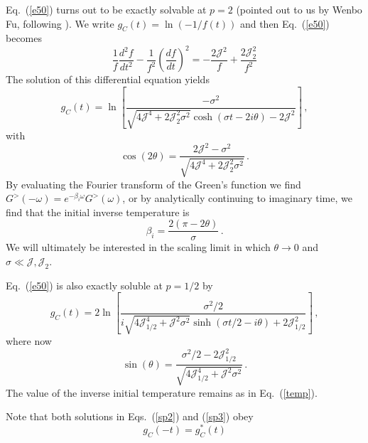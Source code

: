 \documentclass[prx,aps,onecolumn,amsfonts,showpacs,superscriptaddress,preprint,eqsecnum]
{revtex4-1}
\newcommand{\beq}{\begin{equation}}
\newcommand{\eeq}{\end{equation}}
\begin{document}
Eq.~(\ref{e50}) turns out to be exactly solvable at $p=2$ (pointed out to us by Wenbo Fu, following \cite{cenke2017}).
We write $g_C (t) = \ln (-1/f(t))$ and then Eq.~(\ref{e50}) becomes
\beq
\frac{1}{f} \frac{d^2 f}{dt^2} - \frac{1}{f^2} \left( \frac{df}{dt} \right)^2 = - \frac{2 \mathcal{J}^2}{f} + \frac{2 \mathcal{J}^2_2}{f^2}
\eeq
The solution of this differential equation yields
\beq
g_C (t) = \ln \left[ \frac{-\sigma^2}{\sqrt{4 \mathcal{J}^4 + 2 \mathcal{J}_2^2 \sigma^2} \cosh ( \sigma t - 2 i \theta) - 2 \mathcal{J}^2} \right] \,, \label{sp2}
\eeq
with
\beq
\cos(2 \theta) = \frac{2 \mathcal{J}^2 - \sigma^2}{\sqrt{ 4 \mathcal{J}^4 + 2 \mathcal{J}_2^2 \sigma^2}} \,.
\eeq
By evaluating the Fourier transform of the Green's function we find $G^> (-\omega) = e^{-\beta_i \omega} G^> (\omega)$, or by analytically continuing to imaginary time, we find that the
initial inverse temperature is
\beq
\beta_i = \frac{2 (\pi - 2 \theta)}{\sigma} \,. \label{temp}
\eeq
We will ultimately be interested in the scaling limit in which $\theta \rightarrow 0$ and $\sigma \ll \mathcal{J}, \mathcal{J}_2$.

Eq.~(\ref{e50}) is also exactly soluble at $p=1/2$ by
\beq
g_C (t) = 2 \ln \left[ \frac{\sigma^2/2}{i \sqrt{4 \mathcal{J}_{1/2}^4 +  \mathcal{J}^2 \sigma^2} \sinh ( \sigma t/2 -  i \theta) + 2\mathcal{J}_{1/2}^2} \right] \,, \label{sp3}
\eeq
where now
\beq
\sin(\theta) = \frac{\sigma^2/2 - 2\mathcal{J}_{1/2}^2  }{\sqrt{  4\mathcal{J}_{1/2}^4 + \mathcal{J}^2 \sigma^2}} \,.
\eeq
The value of the inverse initial temperature remains as in Eq.~(\ref{temp}).

Note that both solutions in Eqs.~(\ref{sp2}) and (\ref{sp3}) obey
\beq
g_C (-t) = g_C^\ast (t)
\eeq
\end{document}
